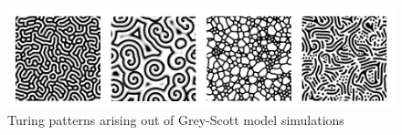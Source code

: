 \begin{figure}[!h]
\centering
\includegraphics[width=\textwidth]{images/turing-patterns.png}
\caption{Turing patterns arising out of Grey-Scott model simulations\cite{sims}}
\label{fig:gs-turing-patterns}
\end{figure}





